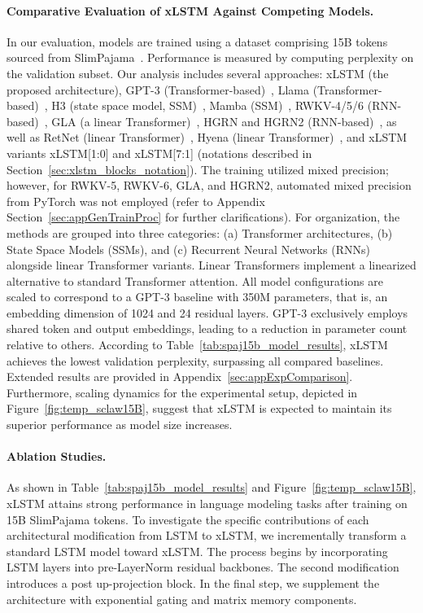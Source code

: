 \paragraph{Comparative Evaluation of xLSTM Against Competing Models.} In our evaluation, models are trained using a dataset comprising 15B tokens sourced from SlimPajama~\citep{Soboleva:23}. Performance is measured by computing perplexity on the validation subset. Our analysis includes several approaches: xLSTM (the proposed architecture), GPT-3 (Transformer-based)~\citep{Brown:20short}, Llama (Transformer-based)~\citep{Touvron:23arxiv}, H3 (state space model, SSM)~\citep{Fu:23}, Mamba (SSM)~\citep{Gu:24arxiv}, RWKV-4/5/6 (RNN-based)~\citep{Peng:23arxivshort,Peng:24arxivshort}, GLA (a linear Transformer)~\citep{Yang:23arxiv}, HGRN and HGRN2 (RNN-based)~\citep{Qin:23,Qin:24arxiv}, as well as RetNet (linear Transformer)~\citep{Sun:23arxiv}, Hyena (linear Transformer)~\citep{Poli:23}, and xLSTM variants xLSTM[1:0] and xLSTM[7:1] (notations described in Section~\ref{sec:xlstm_blocks_notation}). 
The training utilized mixed precision; however, for RWKV-5, RWKV-6, GLA, and HGRN2, automated mixed precision from PyTorch was not employed (refer to Appendix Section~\ref{sec:appGenTrainProc} for further clarifications).
For organization, the methods are grouped into three categories: (a) Transformer architectures, (b) State Space Models (SSMs), and (c) Recurrent Neural Networks (RNNs) alongside linear Transformer variants. Linear Transformers implement a linearized alternative to standard Transformer attention. All model configurations are scaled to correspond to a GPT-3 baseline with 350M parameters, that is, an embedding dimension of 1024 and 24 residual layers. GPT-3 exclusively employs shared token and output embeddings, leading to a reduction in parameter count relative to others. 
According to Table~\ref{tab:spaj15b_model_results}, xLSTM achieves the lowest validation perplexity, surpassing all compared baselines. Extended results are provided in Appendix~\ref{sec:appExpComparison}. 
Furthermore, scaling dynamics for the experimental setup, depicted in Figure~\ref{fig:temp_sclaw15B}, suggest that xLSTM is expected to maintain its superior performance as model size increases.

\paragraph{Ablation Studies.}
As shown in Table~\ref{tab:spaj15b_model_results} and Figure~\ref{fig:temp_sclaw15B}, xLSTM attains strong performance in language modeling tasks after training on 15B SlimPajama tokens. To investigate the specific contributions of each architectural modification from LSTM to xLSTM, we incrementally transform a standard LSTM model toward xLSTM. The process begins by incorporating LSTM layers into pre-LayerNorm residual backbones. The second modification introduces a post up-projection block. In the final step, we supplement the architecture with exponential gating and matrix memory components.

